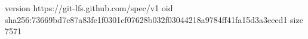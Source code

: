 version https://git-lfs.github.com/spec/v1
oid sha256:73669bd7c87a83fe1f0301cf07628b032f03044218a9784ff41fa15d3a3eeed1
size 7571

